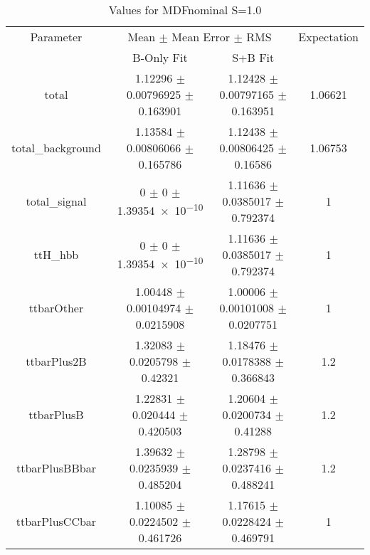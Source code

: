 \begin{table}
\centering
\caption{Values for MDFnominal S=1.0}
\begin{tabular}{cccc}
\toprule
Parameter & \multicolumn{2}{c}{Mean $\pm$ Mean Error $\pm$ RMS} & Expectation\\
 & B-Only Fit & S+B Fit & \\
\midrule
total & \num{1.12296} $\pm$ \num{0.00796925} $\pm$ \num{0.163901} & \num{1.12428} $\pm$ \num{0.00797165} $\pm$ \num{0.163951} & \num{1.06621}\\
total\_background & \num{1.13584} $\pm$ \num{0.00806066} $\pm$ \num{0.165786} & \num{1.12438} $\pm$ \num{0.00806425} $\pm$ \num{0.16586} & \num{1.06753}\\
total\_signal & \num{0} $\pm$ \num{0} $\pm$ \num{1.39354e-10} & \num{1.11636} $\pm$ \num{0.0385017} $\pm$ \num{0.792374} & \num{1}\\
ttH\_hbb & \num{0} $\pm$ \num{0} $\pm$ \num{1.39354e-10} & \num{1.11636} $\pm$ \num{0.0385017} $\pm$ \num{0.792374} & \num{1}\\
ttbarOther & \num{1.00448} $\pm$ \num{0.00104974} $\pm$ \num{0.0215908} & \num{1.00006} $\pm$ \num{0.00101008} $\pm$ \num{0.0207751} & \num{1}\\
ttbarPlus2B & \num{1.32083} $\pm$ \num{0.0205798} $\pm$ \num{0.42321} & \num{1.18476} $\pm$ \num{0.0178388} $\pm$ \num{0.366843} & \num{1.2}\\
ttbarPlusB & \num{1.22831} $\pm$ \num{0.020444} $\pm$ \num{0.420503} & \num{1.20604} $\pm$ \num{0.0200734} $\pm$ \num{0.41288} & \num{1.2}\\
ttbarPlusBBbar & \num{1.39632} $\pm$ \num{0.0235939} $\pm$ \num{0.485204} & \num{1.28798} $\pm$ \num{0.0237416} $\pm$ \num{0.488241} & \num{1.2}\\
ttbarPlusCCbar & \num{1.10085} $\pm$ \num{0.0224502} $\pm$ \num{0.461726} & \num{1.17615} $\pm$ \num{0.0228424} $\pm$ \num{0.469791} & \num{1}\\
\bottomrule
\end{tabular}
\end{table}